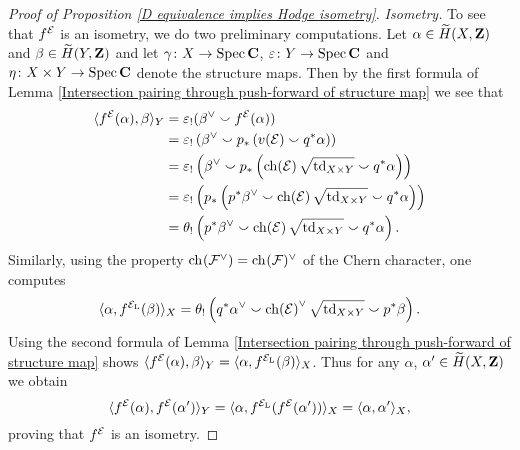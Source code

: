 \begin{proof}[Proof of Proposition \ref{D equivalence implies Hodge isometry}]
    \vspace{0.3cm}
    \noindent
    \textsl{Isometry.}
    To see that $f^{\mathcal E}$ is an isometry, we do two preliminary computations. Let $\alpha \in \widetilde{H}(X, \mathbf Z)$ and $\beta \in \widetilde{H}(Y, \mathbf Z)$ and let $\gamma \colon X \to \operatorname{Spec}\mathbf C$, $\varepsilon \colon Y \to \operatorname{Spec}\mathbf C$ and $\eta \colon X \times Y \to \operatorname{Spec}\mathbf C$ denote the structure maps. Then by the first formula of Lemma \ref{Intersection pairing through push-forward of structure map} we see that
    \begin{align*}
        \pairing{\fmcoh{\E}(\alpha)}{\beta}_Y &= \varepsilon_!(\beta^\vee \smallsmile \fmcoh{\E}(\alpha))
        \\
        &= \varepsilon_!\left(
            \beta^\vee \smallsmile p_*\left(v(\E) \smallsmile q^*\alpha\right)\right) 
        \\
        &= \varepsilon_!\left(
            \beta^\vee \smallsmile p_*\left(\ch{\E}
            {\sqrt{\tdclass{X \times Y}}}
            \smallsmile q^*\alpha\right)
        \right) 
        \\
        &= \varepsilon_!\left( 
            p_*\left(
                p^*\beta^\vee \smallsmile \ch{\E}
                {\sqrt{\tdclass{X \times Y}}}
                \smallsmile q^*\alpha
            \right)
        \right) \\
        &= \theta_!\left(
            p^*\beta^\vee \smallsmile \ch{\E}
                {\sqrt{\tdclass{X \times Y}}}
                \smallsmile q^*\alpha
        \right).
    \end{align*}
    Similarly, using the property $\ch[](\F^\vee) = \ch[](\F)^\vee$ of the Chern character, one computes
    \[
        \pairing{\alpha}{\fmcoh{\ladj{\E}}(\beta)}_X = \theta_!\left(
            q^*\alpha^\vee \smallsmile \ch{\E}^\vee
                {\sqrt{\tdclass{X \times Y}}}
                \smallsmile p^*\beta
        \right).
    \]
    Using the second formula of Lemma \ref{Intersection pairing through push-forward of structure map} shows $\langle f^{\mathcal E}(\alpha), \beta \rangle_Y = \langle \alpha, f^{\mathcal E_\mathrm{L}}(\beta) \rangle_X$.
    Thus for any $\alpha$, $\alpha' \in \widetilde{H}(X, \mathbf Z)$ we obtain
    \[
        \langle f^{\mathcal E}(\alpha), f^{\mathcal E}(\alpha') \rangle_Y = 
        \langle \alpha, f^{\mathcal E_\mathrm{L}}(f^{\mathcal E}(\alpha')) \rangle_X = 
        \langle \alpha, \alpha' \rangle_X,
    \]       
    proving that $f^{\mathcal E}$ is an isometry. 

    \vspace{0.3cm}


\end{proof}
